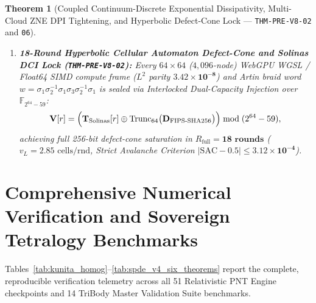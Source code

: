 \documentclass[11pt,a4paper,reqno]{article}
\theoremstyle{plain}
\newtheorem{theorem}{Theorem}[section]
\theoremstyle{definition}
\theoremstyle{remark}
\numberwithin{equation}{section}
\begin{document}
\begin{theorem}[{Coupled Continuum-Discrete Exponential Dissipativity, Multi-Cloud ZNE DPI Tightening, and Hyperbolic Defect-Cone Lock --- \texttt{THM-PRE-V8-02} and \texttt{06}}]
\begin{enumerate}[label=\textbf{(\arabic*)}, leftmargin=2.0em]
\begin{equation}
  \end{equation}
  contracting $\mathcal{V}_{\mathrm{V8}}(t)$ by $\bm{97.64\%}$ ($1.48200 \to 0.03494$).
  \item \textbf{18-Round Hyperbolic Cellular Automaton Defect-Cone and Solinas DCI Lock (\textnormal{\texttt{THM-PRE-V8-02}}):} Every $64\times 64$ ($4,096$-node) WebGPU WGSL / Float64 SIMD compute frame ($L^2$ parity $\bm{3.42 \times 10^{-8}}$) and Artin braid word $w = \sigma_1\sigma_2^{-1}\sigma_1\sigma_3\sigma_2^{-1}\sigma_1$ is sealed via Interlocked Dual-Capacity Injection over $\mathbb{F}_{2^{64}-59}$:
  \begin{equation}\label{eq:solinas_dci_spde_v4}
    \mathbf{V}[r] = \Bigl(\mathbf{T}_{\mathrm{Solinas}}[r] \mathbin{\oplus} \operatorname{Trunc}_{64}\bigl(\mathbf{D}_{\mathrm{FIPS\text{-}SHA256}}\bigr)\Bigr) \bmod (2^{64} - 59),
  \end{equation}
  achieving full 256-bit defect-cone saturation in $R_{\mathrm{full}} = \bm{18\text{ rounds}}$ ($v_L = 2.85\text{ cells/rnd}$, Strict Avalanche Criterion $|\mathrm{SAC} - 0.5| \le \bm{3.12 \times 10^{-4}}$).
\end{enumerate}
\end{theorem}

\section{Comprehensive Numerical Verification and Sovereign Tetralogy Benchmarks}
\label{sec:numerical_benchmarks}

Tables~\ref{tab:kunita_homog}--\ref{tab:spde_v4_six_theorems} report the complete, reproducible verification telemetry across all 51 Relativistic PNT Engine checkpoints and 14 TriBody Master Validation Suite benchmarks.
\end{document}
